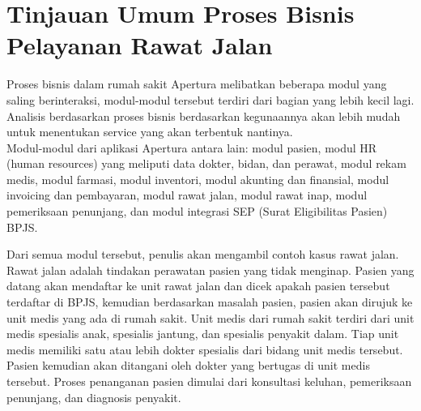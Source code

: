 \begin{adjustbox}{width=1\textwidth}
\begin{minipage}{\linewidth}
\end{minipage}
\end{adjustbox}

\section{Tinjauan Umum Proses Bisnis Pelayanan Rawat Jalan}
Proses bisnis dalam rumah sakit Apertura melibatkan beberapa modul yang saling berinteraksi, modul-modul tersebut terdiri dari bagian yang lebih kecil lagi. Analisis berdasarkan proses bisnis berdasarkan kegunaannya akan lebih mudah untuk menentukan service yang akan terbentuk nantinya.\\
Modul-modul dari aplikasi Apertura antara lain: modul pasien, modul HR (human resources) yang meliputi data dokter, bidan, dan perawat, modul rekam medis, modul farmasi, modul inventori, modul akunting dan finansial, modul invoicing  dan pembayaran, modul rawat jalan, modul rawat inap, modul pemeriksaan penunjang, dan modul integrasi SEP (Surat Eligibilitas Pasien) BPJS.

Dari semua modul tersebut, penulis akan mengambil contoh kasus rawat jalan. Rawat jalan adalah tindakan perawatan pasien yang tidak menginap. Pasien yang datang akan mendaftar ke unit rawat jalan dan dicek apakah pasien tersebut terdaftar di BPJS, kemudian berdasarkan masalah pasien, pasien akan dirujuk ke unit medis yang ada di rumah sakit. Unit medis dari rumah sakit terdiri dari unit medis spesialis anak, spesialis jantung, dan spesialis penyakit dalam. Tiap unit medis memiliki satu atau lebih dokter spesialis dari bidang unit medis tersebut. Pasien kemudian akan ditangani oleh dokter yang bertugas di unit medis tersebut. Proses penanganan pasien dimulai dari konsultasi keluhan, pemeriksaan penunjang, dan diagnosis penyakit.

